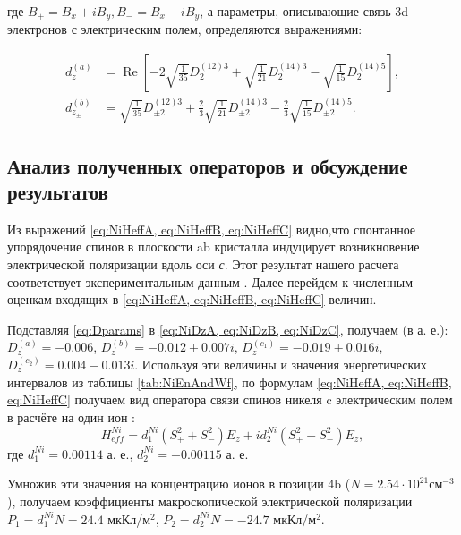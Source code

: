 где $B_{+}=B_{x}+iB_{y}, B_{-}=B_{x}-iB_{y}$, а параметры, описывающие связь 3d-электронов с электрическим полем, определяются выражениями:

\begin{equation}
	\label{eq:CuDz}
	\begin{aligned}
		d_{z}^{(a)}&=\operatorname{Re}\left[-2 \sqrt{\frac{1}{35}} D_{2}^{(12) 3}+\sqrt{\frac{1}{21}} D_{2}^{(14) 3}-\sqrt{\frac{1}{15}} D_{2}^{(14) 5}\right], \\
		d_{z_{\pm}}^{(b)}&=\sqrt{\frac{1}{35}} D_{\pm2}^{(12)3}+\frac{2}{3} \sqrt{\frac{1}{21}} D_{\pm2}^{(14) 3}-\frac{2}{3} \sqrt{\frac{1}{15}} D_{\pm2}^{(14) 5}.
	\end{aligned}
\end{equation}

\subsection{Анализ полученных операторов и обсуждение результатов}\label{subsec:ch2/sec3/sub3}

Из выражений \cref{eq:NiHeffA, eq:NiHeffB, eq:NiHeffC} видно,что спонтанное упорядочение спинов \niIon в плоскости ab кристалла индуцирует возникновение электрической поляризации вдоль оси \textit{с}. Этот результат нашего расчета соответствует экспериментальным данным \cite{Khanh2013}. Далее перейдем к численным оценкам входящих в \cref{eq:NiHeffA, eq:NiHeffB, eq:NiHeffC} величин.

Подставляя \cref{eq:Dparams} в \cref{eq:NiDzA, eq:NiDzB, eq:NiDzC}, получаем (в а. е.): $D_{z}^{(a)}=-0.006$, $D_{z}^{(b)}=-0.012+0.007 i$, $D_{z}^{\left(c_{1}\right)}=-0.019+0.016 i$, $D_{z}^{\left(c_{2}\right)}=0.004-0.013 i$. Используя эти величины и значения энергетических интервалов из таблицы \cref{tab:NiEnAndWf}, по формулам \cref{eq:NiHeffA, eq:NiHeffB, eq:NiHeffC} получаем вид оператора связи спинов никеля c электрическим полем в расчёте на один ион \niIon:
\begin{equation}
	\label{eq:NiHeffSum}
	H_{eff}^{Ni}=d_{1}^{Ni}\left(S_{+}^{2}+S_{-}^{2}\right) E_{z}+i d_{2}^{Ni}\left(S_{+}^{2}-S_{-}^{2}\right) E_{z},
\end{equation}
где $d_{1}^{Ni}=0.00114$ а. е., $d_{2}^{Ni}=-0.00115$ а. е.

Умножив эти значения на концентрацию ионов в позиции 4b ($N\mathop{=}2.54\mathop{\cdot}10^{21} см^{-3}$), получаем коэффициенты макроскопической электрической поляризации $P_{1}=d_{1}^{Ni}N=24.4$ мкКл/м$^{2}$, $P_{2}=d_{2}^{Ni}N=-24.7$ мкКл/м$^{2}$.

